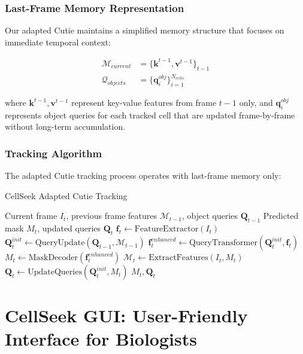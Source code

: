 \documentclass[12pt]{article}
\begin{document}
\subsubsection{Last-Frame Memory Representation}

Our adapted Cutie maintains a simplified memory structure that focuses on immediate temporal context:

\begin{align}
  \mathcal{M}_{current} & = \{\mathbf{k}^{t-1}, \mathbf{v}^{t-1}\}_{t-1} \\
  \mathcal{Q}_{objects} & = \{\mathbf{q}_i^{obj}\}_{i=1}^{N_{cells}}
\end{align}

where $\mathbf{k}^{t-1}, \mathbf{v}^{t-1}$ represent key-value features from frame $t-1$ only, and $\mathbf{q}_i^{obj}$ represents object queries for each tracked cell that are updated frame-by-frame without long-term accumulation.

\subsubsection{Tracking Algorithm}

The adapted Cutie tracking process operates with last-frame memory only:

\begin{algorithm}[H]
  \caption{CellSeek Adapted Cutie Tracking}
  \begin{algorithmic}[1]
    \REQUIRE Current frame $I_t$, previous frame features $\mathcal{M}_{t-1}$, object queries $\mathbf{Q}_{t-1}$
    \ENSURE Predicted mask $M_t$, updated queries $\mathbf{Q}_t$
    \STATE $\mathbf{f}_t \leftarrow \text{FeatureExtractor}(I_t)$
    \STATE $\mathbf{Q}_t^{init} \leftarrow \text{QueryUpdate}(\mathbf{Q}_{t-1}, \mathcal{M}_{t-1})$
    \STATE $\mathbf{f}_t^{enhanced} \leftarrow \text{QueryTransformer}(\mathbf{Q}_t^{init}, \mathbf{f}_t)$
    \STATE $M_t \leftarrow \text{MaskDecoder}(\mathbf{f}_t^{enhanced})$
    \STATE $\mathcal{M}_t \leftarrow \text{ExtractFeatures}(I_t, M_t)$ 
    \STATE $\mathbf{Q}_t \leftarrow \text{UpdateQueries}(\mathbf{Q}_t^{init}, M_t)$
    \RETURN $M_t, \mathbf{Q}_t$
  \end{algorithmic}
\end{algorithm}

\section{CellSeek GUI: User-Friendly Interface for Biologists}
\end{document}
